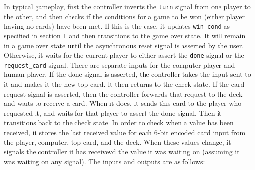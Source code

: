 \documentclass[12pt]{article}
\begin{document}
In typical gameplay, first the controller inverts the \texttt{turn} signal from one player to the other, and then checks if the conditions for a game to be won (either player having no cards) have been met. If this is the case, it updates \texttt{win\_cond} as specified in section 1 and then transitions to the game over state. It will remain in a game over state until the asynchronous reset signal is asserted by the user. Otherwise, it waits for the current player to either assert the \texttt{done} signal or the \texttt{request\_card} signal. There are separate inputs for the computer player and human player. If the done signal is asserted, the controller takes the input sent to it and makes it the new top card. It then returns to the check state. If the card request signal is asserted, then the controller forwards that request to the deck and waits to receive a card. When it does, it sends this card to the player who requested it, and waits for that player to assert the done signal. Then it transitions back to the check state. In order to check when a value has been received, it stores the last received value for each 6-bit encoded card input from the player, computer, top card, and the deck. When these values change, it signals the controller it has receivevd the value it was waiting on (assuming it was waiting on any signal). The inputs and outputs are as follows:\\
\end{document}
